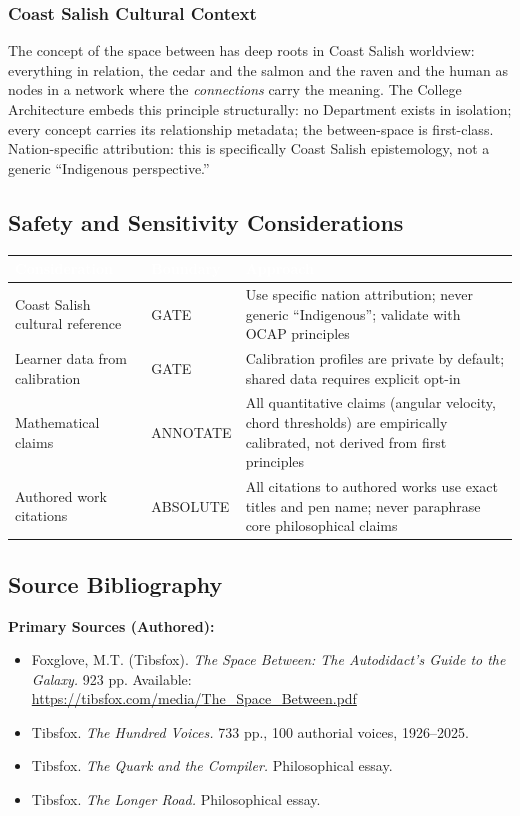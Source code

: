 \documentclass[11pt,letterpaper]{article}
\newcommand{\tableheader}[1]{\textbf{\sffamily\textcolor{white}{#1}}}
\begin{document}
\subsubsection{Coast Salish Cultural Context}

The concept of the space between has deep roots in Coast Salish worldview: everything in relation,
the cedar and the salmon and the raven and the human as nodes in a network where the \textit{connections}
carry the meaning. The College Architecture embeds this principle structurally: no Department exists
in isolation; every concept carries its relationship metadata; the between-space is first-class.
Nation-specific attribution: this is specifically Coast Salish epistemology, not a generic
``Indigenous perspective.''

\subsection{Safety and Sensitivity Considerations}

\begin{center}
\begin{tabularx}{\textwidth}{L{3.5cm}L{2cm}X}
\toprule
{}
\tableheader{Consideration} & \tableheader{Boundary} & \tableheader{Approach} \\
\midrule
Coast Salish cultural reference & GATE & Use specific nation attribution; never generic ``Indigenous''; validate with OCAP\textregistered{} principles \\
Learner data from calibration & GATE & Calibration profiles are private by default; shared data requires explicit opt-in \\
Mathematical claims & ANNOTATE & All quantitative claims (angular velocity, chord thresholds) are empirically calibrated, not derived from first principles \\
Authored work citations & ABSOLUTE & All citations to authored works use exact titles and pen name; never paraphrase core philosophical claims \\
\bottomrule
\end{tabularx}
\end{center}

\subsection{Source Bibliography}

\textbf{Primary Sources (Authored):}
\begin{itemize}[noitemsep]
  \item Foxglove, M.T. (Tibsfox). \textit{The Space Between: The Autodidact's Guide to the Galaxy.} 923 pp. Available: \url{https://tibsfox.com/media/The_Space_Between.pdf}
  \item Tibsfox. \textit{The Hundred Voices.} 733 pp., 100 authorial voices, 1926--2025.
  \item Tibsfox. \textit{The Quark and the Compiler.} Philosophical essay.
  \item Tibsfox. \textit{The Longer Road.} Philosophical essay.
\end{itemize}
\end{document}
